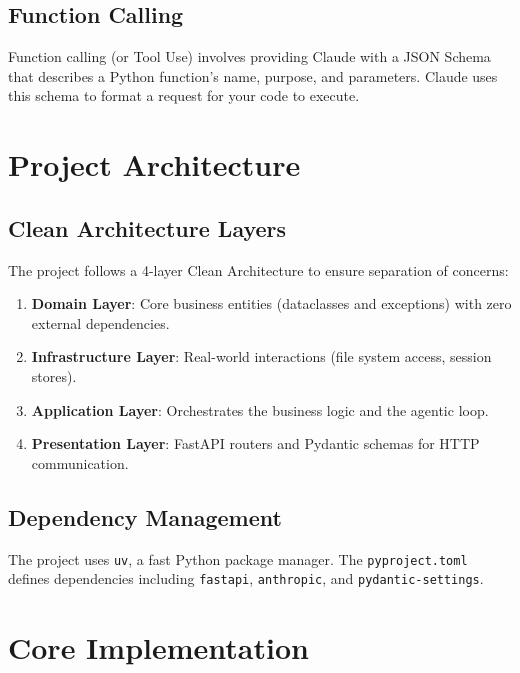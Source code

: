 \documentclass[11pt,a4paper]{report}
\begin{document}
\section{Function Calling}
Function calling (or Tool Use) involves providing Claude with a JSON Schema that describes a Python function's name, purpose, and parameters. Claude uses this schema to format a request for your code to execute.

\chapter{Project Architecture}

\section{Clean Architecture Layers}
The project follows a 4-layer Clean Architecture to ensure separation of concerns:
\begin{enumerate}
    \item \textbf{Domain Layer}: Core business entities (dataclasses and exceptions) with zero external dependencies.
    \item \textbf{Infrastructure Layer}: Real-world interactions (file system access, session stores).
    \item \textbf{Application Layer}: Orchestrates the business logic and the agentic loop.
    \item \textbf{Presentation Layer}: FastAPI routers and Pydantic schemas for HTTP communication.
\end{enumerate}

\section{Dependency Management}
The project uses \texttt{uv}, a fast Python package manager. The \texttt{pyproject.toml} defines dependencies including \texttt{fastapi}, \texttt{anthropic}, and \texttt{pydantic-settings}.

\chapter{Core Implementation}
\end{document}

